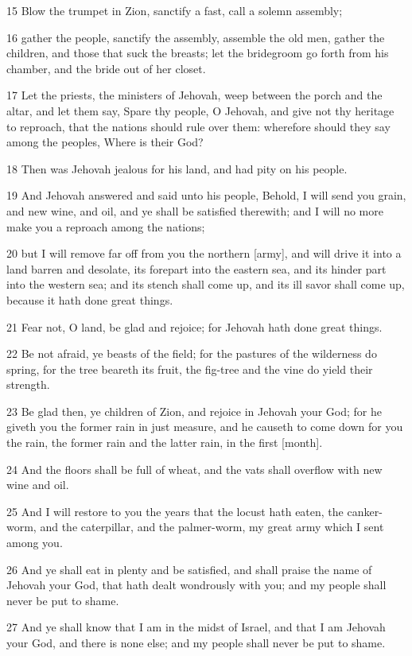 \par 15 Blow the trumpet in Zion, sanctify a fast, call a solemn assembly;
\par 16 gather the people, sanctify the assembly, assemble the old men, gather the children, and those that suck the breasts; let the bridegroom go forth from his chamber, and the bride out of her closet.
\par 17 Let the priests, the ministers of Jehovah, weep between the porch and the altar, and let them say, Spare thy people, O Jehovah, and give not thy heritage to reproach, that the nations should rule over them: wherefore should they say among the peoples, Where is their God?
\par 18 Then was Jehovah jealous for his land, and had pity on his people.
\par 19 And Jehovah answered and said unto his people, Behold, I will send you grain, and new wine, and oil, and ye shall be satisfied therewith; and I will no more make you a reproach among the nations;
\par 20 but I will remove far off from you the northern [army], and will drive it into a land barren and desolate, its forepart into the eastern sea, and its hinder part into the western sea; and its stench shall come up, and its ill savor shall come up, because it hath done great things.
\par 21 Fear not, O land, be glad and rejoice; for Jehovah hath done great things.
\par 22 Be not afraid, ye beasts of the field; for the pastures of the wilderness do spring, for the tree beareth its fruit, the fig-tree and the vine do yield their strength.
\par 23 Be glad then, ye children of Zion, and rejoice in Jehovah your God; for he giveth you the former rain in just measure, and he causeth to come down for you the rain, the former rain and the latter rain, in the first [month].
\par 24 And the floors shall be full of wheat, and the vats shall overflow with new wine and oil.
\par 25 And I will restore to you the years that the locust hath eaten, the canker-worm, and the caterpillar, and the palmer-worm, my great army which I sent among you.
\par 26 And ye shall eat in plenty and be satisfied, and shall praise the name of Jehovah your God, that hath dealt wondrously with you; and my people shall never be put to shame.
\par 27 And ye shall know that I am in the midst of Israel, and that I am Jehovah your God, and there is none else; and my people shall never be put to shame.
